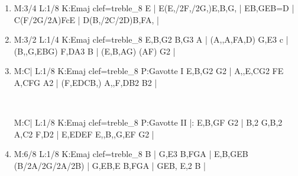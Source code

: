 \documentclass[a4paper,twoside]{article}
\begin{document}
\begin{center}
\begin{itemize}
\begin{enumerate}
  \item {}
\begin{abcsvg}
  M:3/4
  L:1/8
  K:Emaj clef=treble_8
  E | E(E,/2F,/2G,)E,B,G, |
  EB,GEB=D |
  C(F/2G/2A)FcE |
  D(B,/2C/2D)B,FA, |
\end{abcsvg}
  \makebox[2cm][l]{ \dotfill\ \pageref{VIcourante}}
  \par\vspace{\titleseplen}

  \item {}
\begin{abcsvg}
  M:3/2
  L:1/4
  K:Emaj clef=treble_8
  {E,B,}G2 {B,}G3 A |
  ({A,,A,}F{A,}D) {G,}E3 c |
  ({B,,G,E}BG) {F,D}A3 B |
  ({E,B,}AG) (AF) G2 |
\end{abcsvg}
  \makebox[2cm][l]{ \dotfill\ \pageref{VIsarabande}}
  \par\vspace{\titleseplen}

  \item {}
\begin{abcsvg}
  M:C|
  L:1/8
  K:Emaj clef=treble_8
  P:Gavotte I
  {E,B,}G2 G2 |
  {A,,E,C}G2 FE {A,C}FG A2 |
  ({F,}EDCB,) {A,,F,D}B2 B2 |
\end{abcsvg}
  \\
  \hspace*{\titlelen}
\begin{abcsvg}
  M:C|
  L:1/8
  K:Emaj clef=treble_8
  P:Gavotte II
  |: {E,B,}GF G2 |
  B,2 {G,}B,2 {A,}C2 {F,}D2 |
  {E,}EDEF {E,,B,,G,}EF G2 |
\end{abcsvg}
  \makebox[2cm][l]{ \dotfill\ \pageref{VIgavottes}}
  \par\vspace{\titleseplen}

  \item {}
\begin{abcsvg}
  M:6/8
  L:1/8
  K:Emaj clef=treble_8
  B | {G,}E3 {B,}FGA |
  {E,B,}GEB (B/2A/2G/2A/2B) |
  {G,}EB,E {B,}FGA |
  GEB, E,2 B |
\end{abcsvg}
  \makebox[2cm][l]{ \dotfill\ \pageref{VIgigue}}
  \end{enumerate}

\end{itemize}

\end{center}

\cleardoublepage
\label{SuiteI}
\vspace*{2cm}
\end{document}
